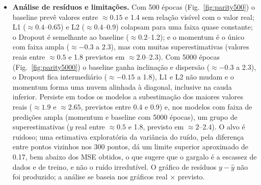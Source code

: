\documentclass[11pt,a4paper]{article}
\begin{document}
\begin{itemize}
\begin{itemize}
  \item \textit{Dropout.} Com 500 épocas, aumentar $p$ de 0.1 a 0.5 piora o MSE de validação (0.578 $\to$ 0.603) e melhora o de teste (0.549 $\to$ 0.526), padrão que se repete com 5000 épocas ($p=0.2$: validação 0.459 contra 0.396 do baseline, teste 0.488 contra 0.529). Como validação e teste discordam, o sinal favorável ao Dropout deve ser lido com cautela. Com 500 épocas o gráfico real $\times$ previsto do Dropout é parecido com o do baseline (Fig.~\ref{fig:parity500}); com 5000 épocas ele passa a ter inclinação positiva, mas com faixa de predições mais estreita que a do baseline (Fig.~\ref{fig:parity5000}).
  \item \textit{Outras análises.} A mudança de 500 para 5000 épocas acentua as diferenças: o baseline ($-0.109\to-0.050$ de $R^2$) e o Dropout ($-0.084\to0.032$) melhoram pouco, o momentum passa de $-0.033$ a $0.395$, e L1 e L2 fortes não mudam (Tabela~\ref{tab:destaque}). Os valores varridos apenas com 500 épocas (Tabela~\ref{tab:abl}) refletem em boa parte a velocidade de aprendizado, já que o baseline ainda não havia convergido.
  \end{itemize}
\item \textbf{Análise de resíduos e limitações.} Com 500 épocas (Fig.~\ref{fig:parity500}) o baseline prevê valores entre $\approx0.15$ e 1.4 sem relação visível com o valor real; L1 ($\approx0.4$--0.65) e L2 ($\approx0.4$--0.9) colapsam para uma faixa quase constante; o Dropout é semelhante ao baseline ($\approx0.2$--1.2); e o momentum é o único com faixa ampla ($\approx-0.3$ a 2.3), mas com muitas superestimativas (valores reais entre $\approx0.5$ e 1.8 previstos em $\approx2.0$--2.3). Com 5000 épocas (Fig.~\ref{fig:parity5000}) o baseline ganha inclinação e dispersão ($\approx-0.3$ a 2.3), o Dropout fica intermediário ($\approx-0.15$ a 1.8), L1 e L2 não mudam e o momentum forma uma nuvem alinhada à diagonal, inclusive na cauda inferior. Persiste em todos os modelos a subestimação dos maiores valores reais ($\approx1.9$ e $\approx2.65$, previstos entre 0.4 e 0.9) e, nos modelos com faixa de predições ampla (momentum e baseline com 5000 épocas), um grupo de superestimativas ($y$ real entre $\approx0.5$ e 1.8, previsto em $\approx2$--2.4). O alvo é ruidoso; uma estimativa exploratória da variância do ruído, pela diferença entre pontos vizinhos nos 300 pontos, dá um limite superior aproximado de 0.17, bem abaixo dos MSE obtidos, o que sugere que o gargalo é a escassez de dados e de treino, e não o ruído irredutível. O gráfico de resíduos $y-\hat y$ não foi produzido; a análise se baseia nos gráficos real $\times$ previsto.

\end{itemize}
\end{document}
